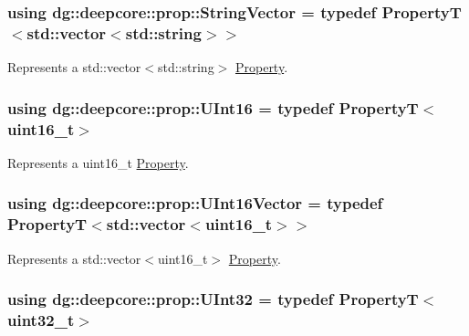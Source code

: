 \subsubsection[{\texorpdfstring{String\+Vector}{StringVector}}]{\setlength{\rightskip}{0pt plus 5cm}using {\bf dg\+::deepcore\+::prop\+::\+String\+Vector} = typedef PropertyT$<$std\+::vector$<$std\+::string$>$$>$}\hypertarget{group___process_properties_gaef939d9856c12ebae8e18db4b112325c}{}\label{group___process_properties_gaef939d9856c12ebae8e18db4b112325c}


Represents a {\ttfamily std\+::vector$<$std\+::string$>$} \hyperlink{classdg_1_1deepcore_1_1_property}{Property}. 

\subsubsection[{\texorpdfstring{U\+Int16}{UInt16}}]{\setlength{\rightskip}{0pt plus 5cm}using {\bf dg\+::deepcore\+::prop\+::\+U\+Int16} = typedef PropertyT$<$uint16\+\_\+t$>$}\hypertarget{group___process_properties_gad8c4325c24fef55f796a02753e8620af}{}\label{group___process_properties_gad8c4325c24fef55f796a02753e8620af}


Represents a {\ttfamily uint16\+\_\+t} \hyperlink{classdg_1_1deepcore_1_1_property}{Property}. 

\subsubsection[{\texorpdfstring{U\+Int16\+Vector}{UInt16Vector}}]{\setlength{\rightskip}{0pt plus 5cm}using {\bf dg\+::deepcore\+::prop\+::\+U\+Int16\+Vector} = typedef PropertyT$<$std\+::vector$<$uint16\+\_\+t$>$$>$}\hypertarget{group___process_properties_ga898c614111f39f3f942b385477705460}{}\label{group___process_properties_ga898c614111f39f3f942b385477705460}


Represents a {\ttfamily std\+::vector$<$uint16\+\_\+t$>$} \hyperlink{classdg_1_1deepcore_1_1_property}{Property}. 

\subsubsection[{\texorpdfstring{U\+Int32}{UInt32}}]{\setlength{\rightskip}{0pt plus 5cm}using {\bf dg\+::deepcore\+::prop\+::\+U\+Int32} = typedef PropertyT$<$uint32\+\_\+t$>$}\hypertarget{group___process_properties_gaf4b72b7a32150a9db0aa1ce09139aa15}{}\label{group___process_properties_gaf4b72b7a32150a9db0aa1ce09139aa15}


